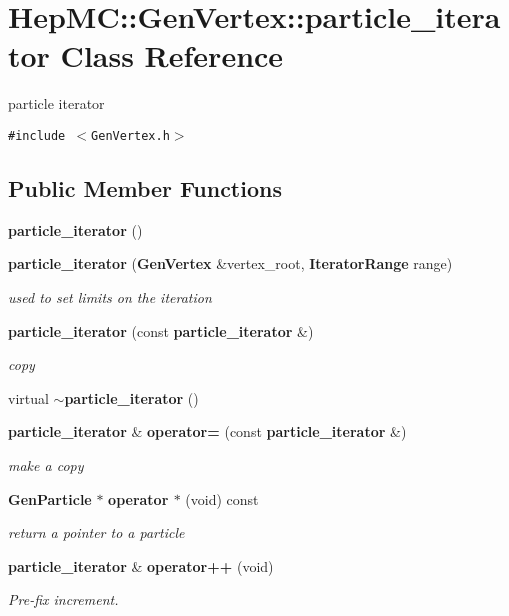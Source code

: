 \section{Hep\-MC::Gen\-Vertex::particle\_\-iterator Class Reference}
\label{classHepMC_1_1GenVertex_1_1particle__iterator}
particle iterator  


{\tt \#include $<$Gen\-Vertex.h$>$}

\subsection*{Public Member Functions}
\begin{CompactItemize}
\item 
{\bf particle\_\-iterator} ()
\item 
{\bf particle\_\-iterator} ({\bf Gen\-Vertex} \&vertex\_\-root, {\bf Iterator\-Range} range)
\begin{CompactList}\small\item\em used to set limits on the iteration \item\end{CompactList}\item 
{\bf particle\_\-iterator} (const {\bf particle\_\-iterator} \&)
\begin{CompactList}\small\item\em copy \item\end{CompactList}\item 
virtual {\bf $\sim$particle\_\-iterator} ()
\item 
{\bf particle\_\-iterator} \& {\bf operator=} (const {\bf particle\_\-iterator} \&)
\begin{CompactList}\small\item\em make a copy \item\end{CompactList}\item 
{\bf Gen\-Particle} $\ast$ {\bf operator $\ast$} (void) const
\begin{CompactList}\small\item\em return a pointer to a particle \item\end{CompactList}\item 
{\bf particle\_\-iterator} \& {\bf operator++} (void)
\begin{CompactList}\small\item\em Pre-fix increment. \item\end{CompactList}\item 

\end{CompactItemize}
